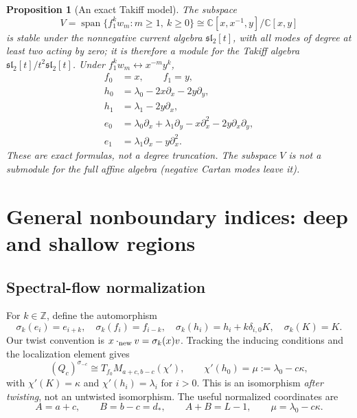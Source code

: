 \documentclass[11pt,a4paper]{article}
\newcommand{\C}{\mathbb C}
\newcommand{\Z}{\mathbb Z}
\newcommand{\slc}{\mathfrak{sl}_2}
\newcommand{\Span}{\operatorname{span}}
\theoremstyle{plainupright}
\newtheorem{proposition}{Proposition}[section]
\begin{document}
\begin{proposition}[An exact Takiff model]\label{prop:takiff}
The subspace
\[
V=\Span\{f_1^kw_m:m\ge1,\ k\ge0\}
\cong\C[x,x^{-1},y]/\C[x,y]
\]
is stable under the nonnegative current algebra \(\slc[t]\), with all modes of
degree at least two acting by zero; it is therefore a module for the Takiff
algebra \(\slc[t]/t^2\slc[t]\). Under \(f_1^kw_m\leftrightarrow x^{-m}y^k\),
\begin{align*}
f_0&=x,\qquad f_1=y,\\
h_0&=\lambda_0-2x\partial_x-2y\partial_y,\\
h_1&=\lambda_1-2y\partial_x,\\
e_0&=\lambda_0\partial_x+\lambda_1\partial_y
      -x\partial_x^2-2y\partial_x\partial_y,\\
e_1&=\lambda_1\partial_x-y\partial_x^2.
\end{align*}
These are exact formulas, not a degree truncation. The subspace \(V\) is not a
submodule for the full affine algebra (negative Cartan modes leave it).
\end{proposition}

\section{General nonboundary indices: deep and shallow regions}\label{sec:deep}

\subsection{Spectral-flow normalization}

For \(k\in\Z\), define the automorphism
\[
\sigma_k(e_i)=e_{i+k},\quad
\sigma_k(f_i)=f_{i-k},\quad
\sigma_k(h_i)=h_i+k\delta_{i,0}K,\quad
\sigma_k(K)=K.
\]
Our twist convention is \(x\cdot_{\rm new}v=\sigma_k(x)v\). Tracking the
inducing conditions and the localization element gives
\begin{equation}\label{eq:spectral}
(Q_c)^{\sigma_{-c}}\cong
T_{f_0}M_{a+c,b-c}(\chi'),
\qquad
\chi'(h_0)=\mu:=\lambda_0-c\kappa,
\end{equation}
with \(\chi'(K)=\kappa\) and \(\chi'(h_i)=\lambda_i\) for \(i>0\). This is an
isomorphism \emph{after twisting}, not an untwisted isomorphism. The useful
normalized coordinates are
\[
A=a+c,\qquad B=b-c=d_*,\qquad A+B=L-1,\qquad \mu=\lambda_0-c\kappa.
\]
\end{document}
